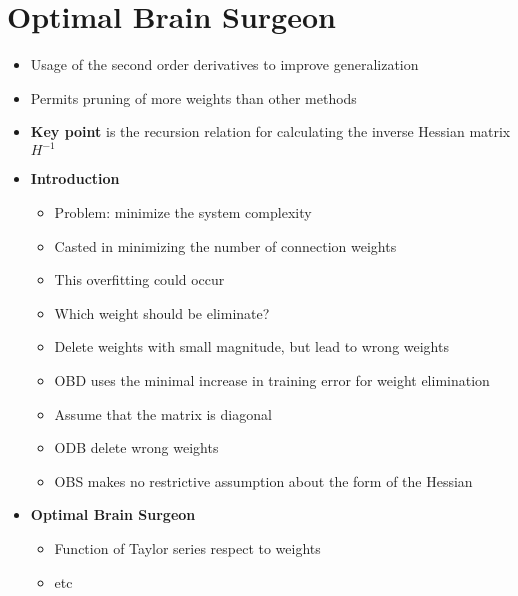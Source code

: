 \chapter{Optimal Brain Surgeon}
\begin{itemize}
    \item Usage of the second order derivatives to improve generalization
    \item Permits pruning of more weights than other methods
    \item \textbf{Key point} is the recursion relation for calculating the inverse Hessian matrix \(H^{-1}\)
    \item \textbf{Introduction}
    \begin{itemize}
        \item Problem: minimize the system complexity
        \item Casted in minimizing the number of connection weights
        \item This overfitting could occur
        \item Which weight should be eliminate?
        \item Delete weights with small magnitude, but lead to wrong weights
        \item OBD uses the minimal increase in training error for weight elimination
        \item Assume that the matrix is diagonal
        \item ODB delete wrong weights
        \item OBS makes no restrictive assumption about the form of the Hessian
    \end{itemize}
    \item \textbf{Optimal Brain Surgeon}
    \begin{itemize}
        \item Function of Taylor series respect to weights
        \item etc
    \end{itemize}
\end{itemize}

